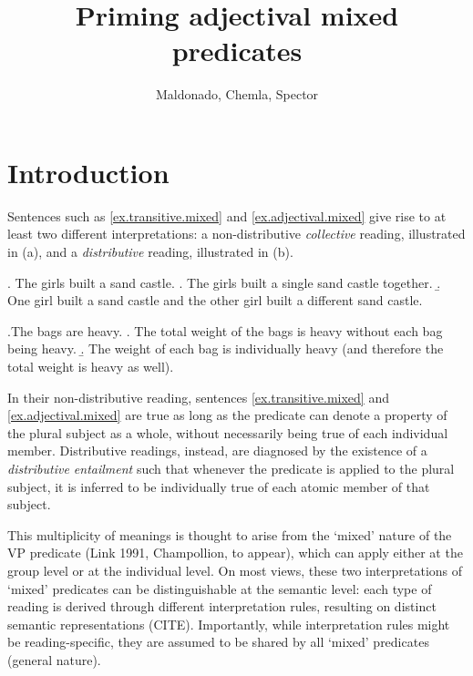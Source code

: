 \documentclass[a4paper, 11pt]{article}
\title{Priming adjectival mixed predicates}
\author{Maldonado, Chemla, Spector}
\begin{document}
\maketitle



\section{Introduction}
Sentences such as \ref{ex.transitive.mixed} and \ref{ex.adjectival.mixed} give rise to at least two different interpretations: a non-distributive \emph{collective} reading, illustrated in (a), and a \emph{distributive} reading, illustrated in (b). 

\ex. The girls built a sand castle. \label{ex.transitive.mixed}
\a. The girls built a single sand castle together. 
\b. One girl built a sand castle and the other girl built a different sand castle.  

\ex.The bags are heavy. \label{ex.adjectival.mixed}
\a. The total weight of the bags is heavy without each bag being heavy. 
\b. The weight of each bag is individually heavy (and therefore the total weight is heavy as well).  

In their non-distributive reading, sentences \ref{ex.transitive.mixed} and \ref{ex.adjectival.mixed} are true as long as the predicate can denote a property of the plural subject as a whole, without necessarily being true of each individual member. 
Distributive readings, instead, are diagnosed by the existence of a \emph{distributive entailment} such that whenever the predicate is applied to the plural subject, it is inferred to be individually true of each atomic member of that subject. 

This multiplicity of meanings is thought to arise from the `mixed' nature of the VP predicate  (Link 1991, Champollion, to appear), which can apply either at the group level or at the individual level. On most views, these two interpretations of `mixed' predicates can be distinguishable at the semantic level: each type of reading is derived through different interpretation rules, resulting on distinct semantic representations (CITE). Importantly, while interpretation rules might be reading-specific, they are assumed to be shared by all `mixed' predicates (general nature). 
\end{document}
